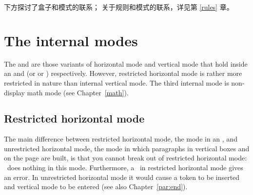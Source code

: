 \documentclass{book}
\begin{document}
下方探讨了盒子和模式的联系；
关于规则和模式的联系，详见第 \ref{rules} 章。

\section{The internal modes}

The  and 
are those variants of horizontal mode and vertical mode
that hold inside an  and  (or 
or ) respectively.
However, restricted horizontal mode is rather more
restricted in nature than internal vertical mode.
The third internal mode is non-display math mode
(see Chapter~\ref{math}).

\subsection{Restricted horizontal mode}

The main difference between restricted horizontal mode,
the mode in an , and unrestricted horizontal mode,
the mode in which paragraphs in vertical boxes
and on the page are built,
is that you cannot break out of restricted horizontal mode: 
~does nothing in this mode. 
Furthermore, a~ in restricted horizontal
mode gives an error. 
In unrestricted horizontal mode it would cause a
 token to be inserted and vertical mode to be entered
(see also Chapter~\ref{par:end}).
\end{document}
